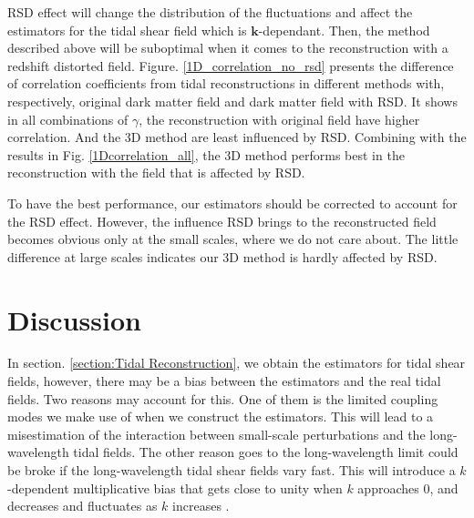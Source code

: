 \documentclass[aps,prd,twocolumn,showpacs,superscriptaddress,groupedaddress,nofootinbib]{revtex4}  %
\begin{document}
RSD effect will change the distribution of the fluctuations and affect the estimators for the tidal shear field which is $\bm{k}$-dependant.  Then, the method described above will be suboptimal when it comes to the reconstruction with a redshift distorted field.
Figure. \ref{1D_correlation_no_rsd} presents the difference of correlation coefficients from tidal reconstructions in different methods with, respectively, original dark matter field and dark matter field with RSD. It shows in all combinations of $\gamma$, the reconstruction with original field have higher correlation. And the 3D method are least influenced by RSD. Combining with the results in Fig. \ref{1Dcorrelation_all}, the 3D method performs best in the reconstruction with the field that is affected by RSD. 

To have the best performance, our estimators should be corrected to account for the RSD effect. However, the influence RSD brings to the reconstructed field becomes obvious only at the small scales, where we do not care about. The little difference at large scales indicates our 3D method is hardly affected by RSD.


\section{Discussion}\label{section:Discussion}

In section. \ref{section:Tidal Reconstruction}, we obtain the estimators for tidal shear fields, however, there may be a bias between the estimators and the real tidal fields. Two reasons may account for this. One of them is the limited coupling modes we make use of when we construct the estimators. This will lead to a misestimation of the interaction between small-scale perturbations and the long-wavelength tidal fields. The other reason goes to the long-wavelength limit could be broke if the long-wavelength tidal shear fields vary fast. This will introduce a $k$-dependent multiplicative bias that gets close to unity when $k$ approaches 0, and decreases and fluctuates as $k$ increases \cite{2008:lu, 2012bucher}. 
\end{document}
